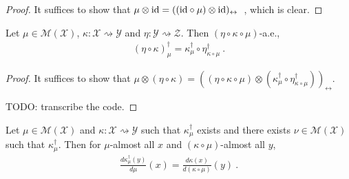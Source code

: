 \begin{proof}\leanok
{}
It suffices to show that $\mu \otimes \textup{id} = ((\textup{id} \circ \mu) \otimes \textup{id})_\leftrightarrow$~, which is clear.
\end{proof}


\begin{lemma}
  \label{lem:bayesInv_comp}
  \leanok
  Let $\mu \in \mathcal M(\mathcal X)$, $\kappa : \mathcal X \rightsquigarrow \mathcal Y$ and $\eta : \mathcal Y \rightsquigarrow \mathcal Z$. Then $(\eta \circ \kappa \circ \mu)$-a.e.,
  \begin{align*}
  (\eta \circ \kappa)_\mu^\dagger = \kappa_{\mu}^\dagger \circ \eta_{\kappa \circ \mu}^\dagger
  \: .
  \end{align*}
\end{lemma}

\begin{proof}\leanok
{}
It suffices to show that $\mu \otimes (\eta \circ \kappa) = ((\eta \circ \kappa \circ \mu) \otimes (\kappa_{\mu}^\dagger \circ \eta_{\kappa \circ \mu}^\dagger))_\leftrightarrow$.

TODO: transcribe the code.
\end{proof}


\begin{lemma}
  \label{lem:rnDeriv_bayesInv}
  Let $\mu \in \mathcal M(\mathcal X)$ and $\kappa : \mathcal X \rightsquigarrow \mathcal Y$ such that $\kappa_\mu^\dagger$ exists and there exists $\nu \in \mathcal M(\mathcal X)$ such that $\kappa_\mu^\dagger$. Then for $\mu$-almost all $x$ and $(\kappa \circ \mu)$-almost all $y$,
  \begin{align*}
  \frac{d \kappa_\mu^\dagger(y)}{d \mu}(x) = \frac{d \kappa(x)}{d(\kappa \circ \mu)}(y)
  \: .
  \end{align*}
\end{lemma}

